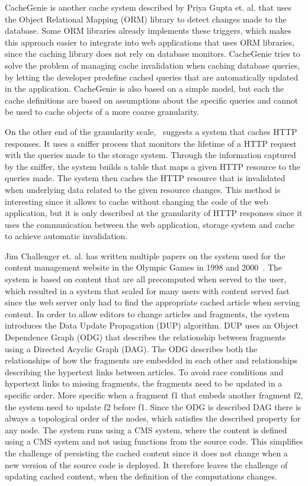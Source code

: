 CacheGenie is another cache system described by Priya Gupta et. al. that uses the Object Relational Mapping (ORM) library to detect changes made to the database. Some ORM libraries already implements these triggers, which makes this approach easier to integrate into web applications that uses ORM libraries, since the caching library does not rely on database monitors. CacheGenie tries to solve the problem of managing cache invalidation when caching database queries, by letting the developer predefine cached queries that are automatically updated in the application. CacheGenie is also based on a simple model, but each the cache definitions are based on assumptions about the specific queries and cannot be used to cache objects of a more coarse granularity.

On the other end of the granularity scale,~\cite{paper:db-driven-http} suggests a system that caches HTTP responses. It uses a sniffer process that monitors the lifetime of a HTTP request with the queries made to the storage system. Through the information captured by the sniffer, the system builds a table that maps a given HTTP resource to the queries made. The system then caches the HTTP resource that is invalidated when underlying data related to the given resource changes. This method is interesting since it allows to cache without changing the code of the web application, but it is only described at the granularity of HTTP responses since it uses the communication between the web application, storage system and cache to achieve automatic invalidation.

Jim Challenger et. al. has written multiple papers on the system used for the content management website in the Olympic Games in 1998 and 2000~\cite{paper:ibm, paper:ibm-extend}. The system is based on content that are all precomputed when served to the user, which resulted in a system that scaled for many users with content served fast since the web server only had to find the appropriate cached article when serving content. In order to allow editors to change articles and fragments, the system introduces the Data Update Propagation (DUP) algorithm. DUP uses an Object Dependence Graph (ODG) that describes the relationship between fragments using a Directed Acyclic Graph (DAG). The ODG describes both the relationships of how the fragments are embedded in each other and relationships describing the hypertext links between articles. To avoid race conditions and hypertext links to missing fragments, the fragments need to be updated in a specific order. More specific when a fragment f1 that embeds another fragment f2, the system need to update f2 before f1. Since the ODG is described DAG there is always a topological order of the nodes, which satisfies the described property for any node. The system runs using a CMS system, where the content is defined using a CMS system and not using functions from the source code. This simplifies the challenge of persisting the cached content since it does not change when a new version of the source code is deployed. It therefore leaves the challenge of updating cached content, when the definition of the computations changes.

